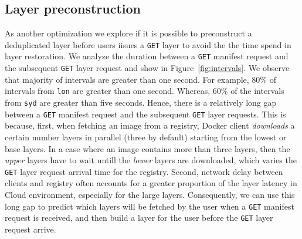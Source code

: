 \subsection{Layer preconstruction}

%
As another optimization we explore if it is possible to preconstruct a 
deduplicated layer before users iisues a \texttt{GET} layer to avoid the
the time spend in layer restoration.
%
We analyze the duration between a \texttt{GET} manifest request and the subsequent
\texttt{GET} layer request and show in Figure~\ref{fig:intervals}.
%
We observe that majority of intervals are greater than one second.
%
For example, 80\% of intervals from \texttt{lon} are greater than one second.
%
Whereas, 60\% of the intervals from \texttt{syd} are greater than five seconds. 
%
Hence, there is a relatively long gap
between a \texttt{GET} manifest request and the subsequent \texttt{GET}
layer requests.
%
This is because, first, when fetching an image from a registry,
Docker client \emph{downloads} a certain number layers in parallel (three by
default) starting from the lowest or base layers.
%
In a case where an image
contains more than three layers, then the \emph{upper} layers have to wait untill the
\emph{lower} layers are downloaded, which varies the \texttt{GET} layer request
arrival time for the registry.
%
Second, network delay between clients and registry
often accounts for a greater proportion of the  layer latency in Cloud
environment, especially for the large layers.
%
Consequently, we can use this long
gap to predict which layers will be fetched by the user when a \texttt{GET}
manifest request is received, and then build a layer for the user before
the \texttt{GET} layer request arrive.


